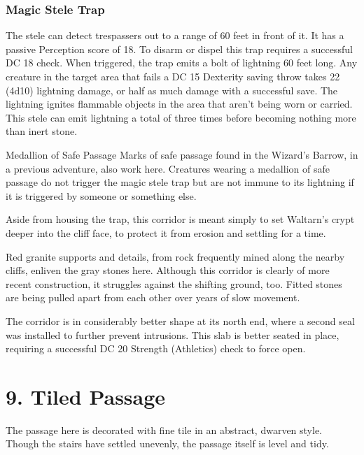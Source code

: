 \documentclass[10pt,a4paper,twoside,twocolumn,openany,bg=print,nodeprecatedcode]{dndbook}
\begin{document}
\subsubsection{Magic Stele Trap}
The stele can detect trespassers out to a range of 60 feet in front of it. It has a passive Perception score of 18. To disarm or dispel this trap requires a successful DC 18 check. When triggered, the trap emits a bolt of lightning 60 feet long. Any creature in the target area that fails a DC 15 Dexterity saving throw takes 22 (4d10) lightning damage, or half as much damage with a successful save.
The lightning ignites flammable objects in the area that aren't being worn or carried. This stele can emit lightning a total of three times before becoming nothing more than inert stone.
\begin{DndComment}{Medallion of Safe Passage}
Marks of safe passage found in the Wizard's Barrow, in a previous adventure, also work here. Creatures wearing a medallion of safe passage do not trigger the magic stele trap but are not immune to its lightning if it is triggered by someone or something else.
\end{DndComment}

Aside from housing the trap, this corridor is meant simply to set Waltarn's crypt deeper into the cliff face, to protect it from erosion and settling for a time.
\begin{DndReadAloud}{}
Red granite supports and details, from rock frequently mined along the nearby cliffs, enliven the gray stones here. Although this corridor is clearly of more recent construction, it struggles against the shifting ground, too. Fitted stones are being pulled apart from each other over years of slow movement.
\end{DndReadAloud}

The corridor is in considerably better shape at its north end, where a second seal was installed to further prevent intrusions. This slab is better seated in place, requiring a successful DC 20 Strength (Athletics) check to force open.
\section{9. Tiled Passage}
\begin{DndReadAloud}{}
The passage here is decorated with fine tile in an abstract, dwarven style. Though the stairs have settled unevenly, the passage itself is level and tidy.
\end{DndReadAloud}
\end{document}
